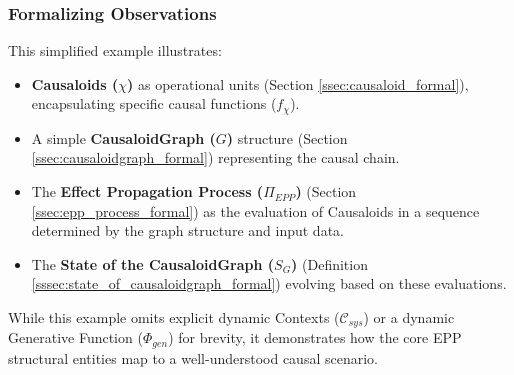     \subsubsection{Formalizing Observations}
    \label{ssec:example_observations_connection}
    This simplified example illustrates:
    \begin{itemize}
        \item \textbf{Causaloids (\(\chi\))} as operational units (Section \ref{ssec:causaloid_formal}), encapsulating specific causal functions (\(f_\chi\)).
        \item A simple \textbf{CausaloidGraph (\(G\))} structure (Section \ref{ssec:causaloidgraph_formal}) representing the causal chain.
        \item The \textbf{Effect Propagation Process (\(\Pi_{EPP}\))} (Section \ref{ssec:epp_process_formal}) as the evaluation of Causaloids in a sequence determined by the graph structure and input data.
        \item The \textbf{State of the CausaloidGraph (\(S_G\))} (Definition \ref{sssec:state_of_causaloidgraph_formal}) evolving based on these evaluations.
    \end{itemize}
    While this example omits explicit dynamic Contexts (\(\mathcal{C}_{sys}\)) or a dynamic Generative Function (\(\Phi_{gen}\)) for brevity, it demonstrates how the core EPP structural entities map to a well-understood causal scenario.